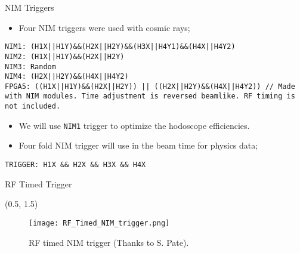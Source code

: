 \documentclass[10pt, xcolor={dvipsnames}, aspectratio = 169, sans,mathserif]{beamer}
\begin{document}
\begin{frame}[fragile]{NIM Triggers}

\begin{itemize}
    \item Four NIM triggers were used with cosmic rays;
\end{itemize}

\begin{verbatim}
NIM1: (H1X||H1Y)&&(H2X||H2Y)&&(H3X||H4Y1)&&(H4X||H4Y2)
NIM2: (H1X||H1Y)&&(H2X||H2Y)
NIM3: Random
NIM4: (H2X||H2Y)&&(H4X||H4Y2)
FPGA5: ((H1X||H1Y)&&(H2X||H2Y)) || ((H2X||H2Y)&&(H4X||H4Y2)) // Made
with NIM modules. Time adjustment is reversed beamlike. RF timing is
not included.
\end{verbatim}

\begin{itemize}

    \item We will use \verb|NIM1| trigger to optimize the hodoscope efficiencies.

    \item Four fold NIM trigger will use in the beam time for physics data;
\end{itemize}

\begin{verbatim}
TRIGGER: H1X && H2X && H3X && H4X
\end{verbatim}

\end{frame}

\begin{frame}{RF Timed Trigger}

\begin{textblock}{14.0}(0.5, 1.5)
\begin{figure}
    \centering
    \texttt{[image: RF\_Timed\_NIM\_trigger.png]}
    \caption{RF timed NIM trigger (Thanks to S. Pate).}
\end{figure}
\end{textblock}

\end{frame}
\end{document}
